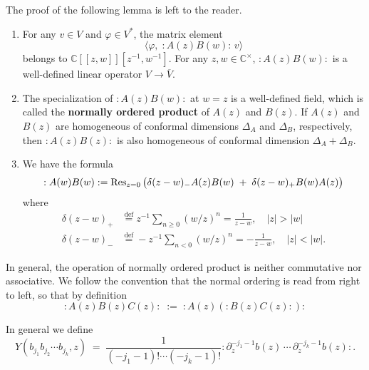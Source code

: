 \documentclass[12pt]{article}
\begin{document}
The proof of the following lemma is left to the reader.

\begin{lemma}[2.2.3]
    \leavevmode
    \begin{enumerate}
        \item
              For any $v\in V$ and $\varphi\in V^*$, the matrix element
              \[
                  \langle \varphi,\; :A(z)B(w):\,v\rangle
              \]
              belongs to $\mathbb{C}[[z,w]][z^{-1},w^{-1}]$.
              For any $z,w\in\mathbb{C}^\times$, $:A(z)B(w):$ is a well-defined linear operator $V\to\overline{V}$.

        \item
              The specialization of $:A(z)B(w):$ at $w=z$ is a well-defined field,
              which is called the \textbf{normally ordered product} of $A(z)$ and $B(z)$.
              If $A(z)$ and $B(z)$ are homogeneous of conformal dimensions
              $\Delta_A$ and $\Delta_B$, respectively, then
              $:A(z)B(z):$ is also homogeneous of conformal dimension $\Delta_A+\Delta_B$.
        \item We have the formula
              \[
                  :A(w)B(w):
                  = \operatorname{Res}_{z=0}\big(
                  \delta(z-w)_-A(z)B(w)
                  \;+\;
                  \delta(z-w)_+B(w)A(z)
                  \big)
              \] where \begin{align*}
                  \delta(z-w)_+ & \stackrel{\mathrm{def}}{=} z^{-1}\sum_{n\ge0} (w/z)^n = \frac{1}{z-w}, \quad |z|>|w|  \\
                  \delta(z-w)_- & \stackrel{\mathrm{def}}{=} -z^{-1}\sum_{n<0} (w/z)^n = -\frac{1}{z-w}, \quad |z|<|w|.
              \end{align*}
    \end{enumerate}
\end{lemma}


\begin{remark}
    In general, the operation of normally ordered product is neither commutative nor associative.
    We follow the convention that the normal ordering is read from right to left,
    so that by definition
    \[
        :A(z)B(z)C(z):
        \;:=\;
        :A(z)(:B(z)C(z):):
    \]
\end{remark}

In general we define
\begin{equation}\label{2.2.3}
    Y(b_{j_1} b_{j_2} \cdots b_{j_k}, z)
    \;=\;
    \frac{1}{(-j_1-1)!\cdots(-j_k-1)!}
    :\partial_z^{-j_1-1} b(z)\,\cdots\,\partial_z^{-j_k-1} b(z):.
\end{equation}
\end{document}

